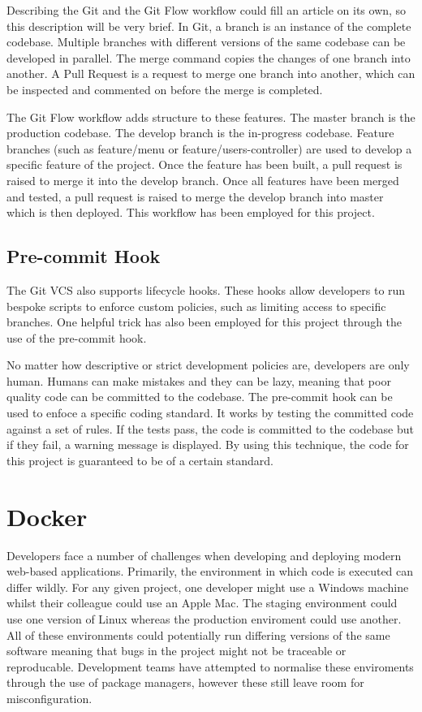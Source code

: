    Describing the Git and the Git Flow workflow could fill an article on its own, so this description will be very brief. In Git, a branch is an instance of the complete codebase. Multiple branches with different versions of the same codebase can be developed in parallel. The merge command copies the changes of one branch into another. A Pull Request is a request to merge one branch into another, which can be inspected and commented on before the merge is completed.

    The Git Flow workflow adds structure to these features. The master branch is the production codebase. The develop branch is the in-progress codebase. Feature branches (such as feature/menu or feature/users-controller) are used to develop a specific feature of the project. Once the feature has been built, a pull request is raised to merge it into the develop branch. Once all features have been merged and tested, a pull request is raised to merge the develop branch into master which is then deployed. This workflow has been employed for this project.

    \subsection{Pre-commit Hook}
      The Git VCS also supports lifecycle hooks. These hooks allow developers to run bespoke scripts to enforce custom policies, such as limiting access to specific branches. One helpful trick has also been employed for this project through the use of the pre-commit hook.

      No matter how descriptive or strict development policies are, developers are only human. Humans can make mistakes and they can be lazy, meaning that poor quality code can be committed to the codebase. The pre-commit hook can be used to enfoce a specific coding standard. It works by testing the committed code against a set of rules. If the tests pass, the code is committed to the codebase but if they fail, a warning message is displayed. By using this technique, the code for this project is guaranteed to be of a certain standard.

  \section{Docker}
    Developers face a number of challenges when developing and deploying modern web-based applications. Primarily, the environment in which code is executed can differ wildly. For any given project, one developer might use a Windows machine whilst their colleague could use an Apple Mac. The staging environment could use one version of Linux whereas the production enviroment could use another. All of these environments could potentially run differing versions of the same software meaning that bugs in the project might not be traceable or reproducable. Development teams have attempted to normalise these enviroments through the use of package managers, however these still leave room for misconfiguration.

